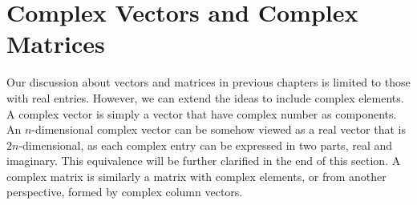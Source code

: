 \section{Complex Vectors and Complex Matrices}

Our discussion about vectors and matrices in previous chapters is limited to those with real entries. However, we can extend the ideas to include complex elements. A complex vector is simply a vector that have complex number as components. An $n$-dimensional complex vector can be somehow viewed as a real vector that is $2n$-dimensional, as each complex entry can be expressed in two parts, real and imaginary. This equivalence will be further clarified in the end of this section. A complex matrix is similarly a matrix with complex elements, or from another perspective, formed by complex column vectors.

